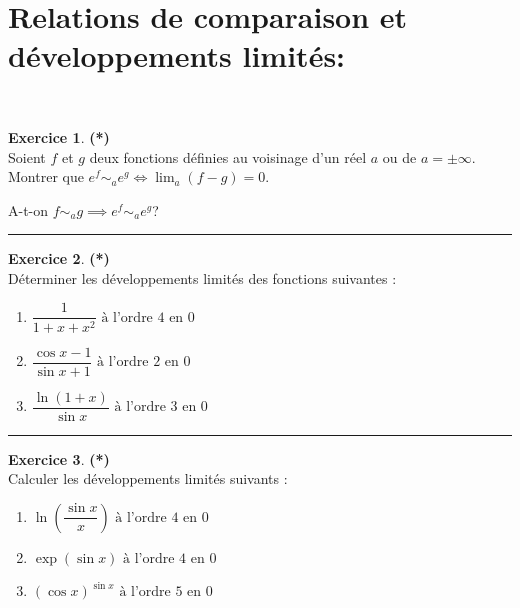 \documentclass[a4paper,11pt]{article}
\theoremstyle{definition}
\newtheorem{exo}{Exercice} %
\begin{document}
\raggedright

\section*{Relations de comparaison et développements limités:}\hfill\\%
\begin{minipage}{1\linewidth}
	\begin{minipage}[t]{0.48\linewidth}
		\raggedright
	
\begin{exo}\textbf{(*)}\quad\\[0.2cm]
	Soient $f$ et $g$ deux fonctions définies au voisinage d'un réel $a$ ou de $a=\pm\infty$. Montrer que
	$e^f\sim_a e^g\iff \lim_a(f-g)=0$.
	
	A-t-on $f\sim_a g\implies e^f\sim_a e^g$?
	
	
	\centering
	\rule{1\linewidth}{0.6pt}
\end{exo}



\begin{exo}\textbf{(*)}\quad\\[0.2cm]
 Déterminer les développements limités des fonctions suivantes :
 
 	\begin{enumerate}
 		\item $\displaystyle\dfrac{1}{1+x+x^2}\textrm{ à l'ordre 4 en 0}$
 		\item $\displaystyle\dfrac{\cos x-1}{\sin x+1}\textrm{ à l'ordre 2 en 0}$
 		\item $\displaystyle\dfrac{\ln(1+x)}{\sin x}\textrm{ à l'ordre 3 en 0}$
 	\end{enumerate}	
	\centering
	\rule{1\linewidth}{0.6pt}
\end{exo}

\begin{exo}\textbf{(*)}\quad\\[0.2cm]
	
	Calculer les développements limités suivants :
	
		\begin{enumerate}
		\item $\displaystyle\ln\left(\dfrac{\sin x}{x}\right)\textrm{ à l'ordre 4 en 0}$
		\item $\displaystyle\exp(\sin x)\textrm{ à l'ordre 4 en 0}$
		\item $\displaystyle(\cos x)^{\sin x}\textrm{ à l'ordre 5 en 0}$
	\end{enumerate}	


\end{exo}
\end{minipage}
\end{minipage}
\end{document}
